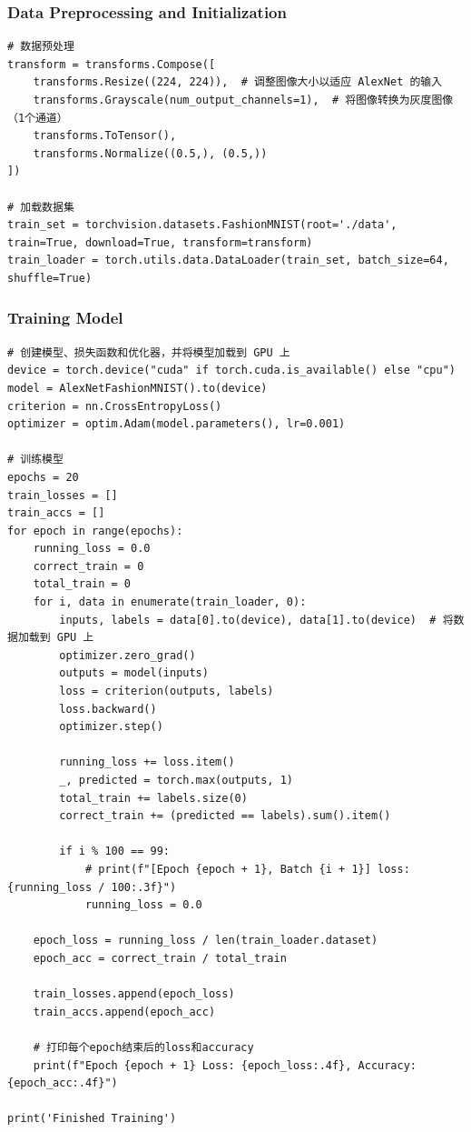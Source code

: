\documentclass[a4paper,12pt]{article}
\begin{document}
\subsubsection{Data Preprocessing and Initialization}
\begin{lstlisting}
# 数据预处理
transform = transforms.Compose([
    transforms.Resize((224, 224)),  # 调整图像大小以适应 AlexNet 的输入
    transforms.Grayscale(num_output_channels=1),  # 将图像转换为灰度图像（1个通道）
    transforms.ToTensor(),
    transforms.Normalize((0.5,), (0.5,))
])

# 加载数据集
train_set = torchvision.datasets.FashionMNIST(root='./data', train=True, download=True, transform=transform)
train_loader = torch.utils.data.DataLoader(train_set, batch_size=64, shuffle=True)

\end{lstlisting}

\subsubsection{Training Model}
\begin{lstlisting}
# 创建模型、损失函数和优化器，并将模型加载到 GPU 上
device = torch.device("cuda" if torch.cuda.is_available() else "cpu")
model = AlexNetFashionMNIST().to(device)
criterion = nn.CrossEntropyLoss()
optimizer = optim.Adam(model.parameters(), lr=0.001)

# 训练模型
epochs = 20
train_losses = []
train_accs = []
for epoch in range(epochs):
    running_loss = 0.0
    correct_train = 0
    total_train = 0
    for i, data in enumerate(train_loader, 0):
        inputs, labels = data[0].to(device), data[1].to(device)  # 将数据加载到 GPU 上
        optimizer.zero_grad()
        outputs = model(inputs)
        loss = criterion(outputs, labels)
        loss.backward()
        optimizer.step()
        
        running_loss += loss.item()
        _, predicted = torch.max(outputs, 1)
        total_train += labels.size(0)
        correct_train += (predicted == labels).sum().item()

        if i % 100 == 99:
            # print(f"[Epoch {epoch + 1}, Batch {i + 1}] loss: {running_loss / 100:.3f}")
            running_loss = 0.0

    epoch_loss = running_loss / len(train_loader.dataset)
    epoch_acc = correct_train / total_train

    train_losses.append(epoch_loss)
    train_accs.append(epoch_acc)

    # 打印每个epoch结束后的loss和accuracy
    print(f"Epoch {epoch + 1} Loss: {epoch_loss:.4f}, Accuracy: {epoch_acc:.4f}")

print('Finished Training')

\end{lstlisting}
\end{document}
